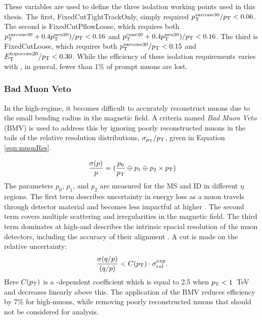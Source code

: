 These variables are used to define the three isolation working points used in this thesis.
The first, FixedCutTightTrackOnly, simply required $p_\text{T}^\text{varcone30}/p_\text{T}<0.06$.
The second is FixedCutPflowLoose, which requires both $p_\text{T}^\text{varcone30}+0.4p_\text{T}^\text{neu20})/p_\text{T}<0.16$ and $p_\text{T}^\text{cone20}+0.4p_\text{T}^\text{neu20})/p_\text{T}<0.16$.
The third is FixedCutLoose, which requires both $p_\text{T}^\text{varcone30}/p_\text{T}<0.15$ and $E_\text{T}^\text{topocone20}/p_\text{T}<0.30$.
While the efficiency of these isolation requirements varies with \pt, in general, fewer than 1\% of prompt muons are lost.
\cite{muonReco}

\subsubsection{Bad Muon Veto}\label{sec:bmv}

In the high-\pt regime, it becomes difficult to accurately reconstruct muons due to the small bending radius in the magnetic field.
A criteria named \emph{Bad Muon Veto} (BMV) is used to address this by ignoring poorly reconstructed muons in the tails of the relative \pt resolution distributions, $\sigma_{p_\text{T}}/p_\text{T}$, given in Equation \ref{eqn:muonRes}.

\begin{equation}\begin{split}\label{eqn:muonRes}
    \frac{\sigma(p)}{p}=(\frac{p_0}{p_\text{T}}\oplus p_1 \oplus p_2\times p_\text{T})
\end{split}\end{equation} 
The parameters $p_0$, $p_1$, and $p_2$ are measured for the MS and ID in different $\eta$ regions. 
The first term describes uncertainty in energy loss as a muon travels through detector material and becomes less impactful at higher \pt.
The second term covers multiple scattering and irregularities in the magnetic field.
The third term dominates at high-\pt and describes the intrinsic spacial resolution of the muon detectors, including the accuracy of their alignment \cite{muonReco}.
A cut is made on the relative uncertainty:
\begin{equation}
\frac{\sigma(q/p)}{(q/p)} < C(p_\text{T})\cdot \sigma_{rel}^{exp}.
\end{equation}
Here $C(p_\text{T})$ is a \pt-dependent coefficient which is equal to 2.5 when $p_\text{T}<1$~TeV and decreases linearly above this.
The application of the BMV reduces efficiency by 7\% for high-\pt muons, while removing poorly reconstructed muons that should not be considered for analysis.


